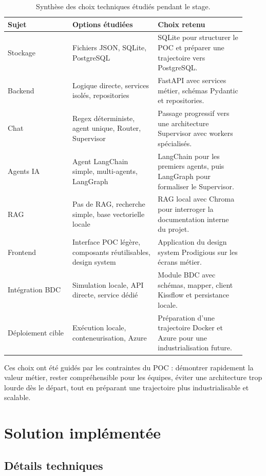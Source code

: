 \documentclass[a4paper,11pt,english,openany]{book}
\begin{document}
\begin{longtable}{|L{0.25\linewidth}|L{0.33\linewidth}|L{0.34\linewidth}|}
\caption{Synthèse des choix techniques étudiés pendant le stage.}\\
\hline
\textbf{Sujet} & \textbf{Options étudiées} & \textbf{Choix retenu}\\
\hline
Stockage & Fichiers JSON, SQLite, PostgreSQL & SQLite pour structurer le POC et préparer une trajectoire vers PostgreSQL.\\
\hline
Backend & Logique directe, services isolés, repositories & FastAPI avec services métier, schémas Pydantic et repositories.\\
\hline
Chat & Regex déterministe, agent unique, Router, Supervisor & Passage progressif vers une architecture Supervisor avec workers spécialisés.\\
\hline
Agents IA & Agent LangChain simple, multi-agents, LangGraph & LangChain pour les premiers agents, puis LangGraph pour formaliser le Supervisor.\\
\hline
RAG & Pas de RAG, recherche simple, base vectorielle locale & RAG local avec Chroma pour interroger la documentation interne du projet.\\
\hline
Frontend & Interface POC légère, composants réutilisables, design system & Application du design system Prodigious sur les écrans métier.\\
\hline
Intégration BDC & Simulation locale, API directe, service dédié & Module BDC avec schémas, mapper, client Kissflow et persistance locale.\\
\hline
Déploiement cible & Exécution locale, conteneurisation, Azure & Préparation d'une trajectoire Docker et Azure pour une industrialisation future.\\
\hline
\end{longtable}

Ces choix ont été guidés par les contraintes du POC : démontrer rapidement la valeur métier, rester compréhensible pour les équipes, éviter une architecture trop lourde dès le départ, tout en préparant une trajectoire plus industrialisable et scalable.

\section{Solution implémentée}
\subsection{Détails techniques}
\end{document}
